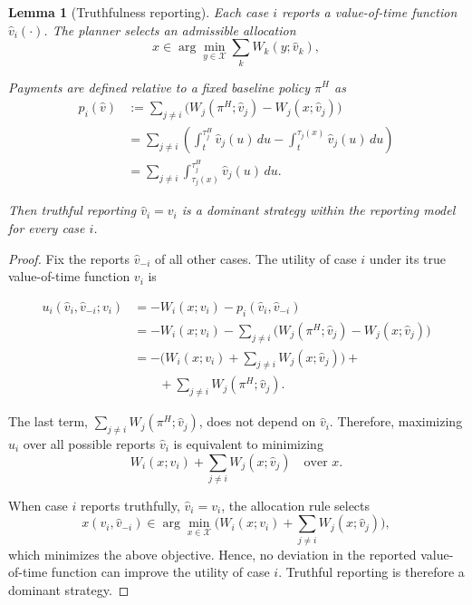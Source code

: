 \documentclass[letterpaper]{article}
\newtheorem{lemma}{Lemma}
\begin{document}
\begin{lemma}[Truthfulness reporting]
\label{lem:truthful}
Each case $i$ reports a value-of-time function $\hat v_i(\cdot)$.
The planner selects an admissible allocation
\[
x \in \arg\min_{y \in \mathcal{X}} 
\sum_{k} W_k(y; \hat v_k),
\]

Payments are defined relative to a fixed baseline policy $\pi^{H}$ as
\begin{align*}
p_i(\hat v)
&:=
\sum_{j \neq i}
\Big(
W_j(\pi^{H}; \hat v_j)
-
W_j(x; \hat v_j)
\Big) \\[0.5em]
&=
\sum_{j \neq i}
\left(
\int_{t}^{\tau_j^{H}} \hat v_j(u)\,du
-
\int_{t}^{\tau_j(x)} \hat v_j(u)\,du
\right) \\[0.5em]
&=
\sum_{j \neq i}
\int_{\tau_j(x)}^{\tau_j^{H}}
\hat v_j(u)\,du .
\end{align*}


Then truthful reporting $\hat v_i = v_i$ is a dominant strategy within the reporting model for every
case $i$.
\end{lemma}

\begin{proof}
Fix the reports $\hat v_{-i}$ of all other cases.
The utility of case $i$ under its true value-of-time function $v_i$ is

\begin{align*}
u_i(\hat v_i, \hat v_{-i}; v_i)
&=
- W_i(x; v_i) - p_i(\hat v_i, \hat v_{-i}) \\[0.5em]
&=
- W_i(x; v_i)
-
\sum_{j \neq i}
\Big(
W_j(\pi^{H}; \hat v_j)
-
W_j(x; \hat v_j)
\Big) \\[0.5em]
&=
-
\Big(
W_i(x; v_i)
+
\sum_{j \neq i} W_j(x; \hat v_j)
\Big) +\\[0.25em]
&\hspace{2em}
+
\sum_{j \neq i} W_j(\pi^{H}; \hat v_j).
\end{align*}


The last term,
$\sum_{j \neq i} W_j(\pi^{H}; \hat v_j)$,
does not depend on $\hat v_i$.
Therefore, maximizing $u_i$ over all possible reports $\hat v_i$
is equivalent to minimizing
\[
W_i(x; v_i)
+
\sum_{j \neq i} W_j(x; \hat v_j)
\quad
\text{over } x.
\]

When case $i$ reports truthfully, $\hat v_i = v_i$,
the allocation rule selects
\[
x(v_i, \hat v_{-i})
\in
\arg\min_{x \in \mathcal{X}}
\Big(
W_i(x; v_i)
+
\sum_{j \neq i} W_j(x; \hat v_j)
\Big),
\]
which minimizes the above objective.
Hence, no deviation in the reported value-of-time function
can improve the utility of case $i$.
Truthful reporting is therefore a dominant strategy.
\end{proof}
\end{document}
